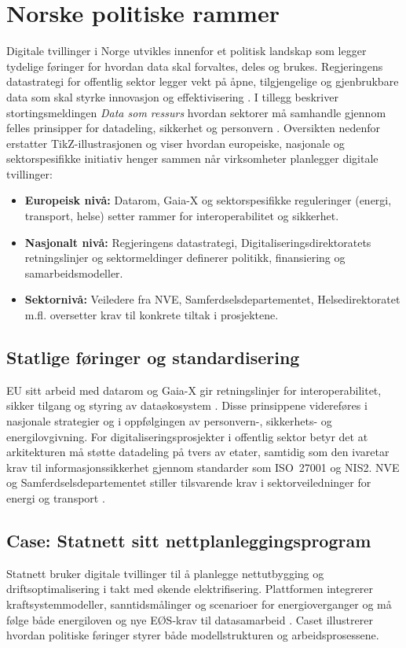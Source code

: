 \section{Norske politiske rammer}
Digitale tvillinger i Norge utvikles innenfor et politisk landskap som legger tydelige føringer for hvordan data skal forvaltes, deles og brukes. Regjeringens datastrategi for offentlig sektor legger vekt på åpne, tilgjengelige og gjenbrukbare data som skal styrke innovasjon og effektivisering \citep{regjeringen2022datastrategi}. I tillegg beskriver stortingsmeldingen \emph{Data som ressurs} hvordan sektorer må samhandle gjennom felles prinsipper for datadeling, sikkerhet og personvern \citep{meldst22datasomressurs}. Oversikten nedenfor erstatter TikZ-illustrasjonen og viser hvordan europeiske, nasjonale og sektorspesifikke initiativ henger sammen når virksomheter planlegger digitale tvillinger:
\begin{itemize}
    \item \textbf{Europeisk nivå:} Datarom, Gaia-X og sektorspesifikke reguleringer (energi, transport, helse) setter rammer for interoperabilitet og sikkerhet.
    \item \textbf{Nasjonalt nivå:} Regjeringens datastrategi, Digitaliseringsdirektoratets retningslinjer og sektormeldinger definerer politikk, finansiering og samarbeidsmodeller.
    \item \textbf{Sektornivå:} Veiledere fra NVE, Samferdselsdepartementet, Helsedirektoratet m.fl. oversetter krav til konkrete tiltak i prosjektene.
\end{itemize}

\subsection{Statlige føringer og standardisering}
EU sitt arbeid med datarom og Gaia-X gir retningslinjer for interoperabilitet, sikker tilgang og styring av dataøkosystem \citep{eu2020circulareconomy}. Disse prinsippene videreføres i nasjonale strategier og i oppfølgingen av personvern-, sikkerhets- og energilovgivning. For digitaliseringsprosjekter i offentlig sektor betyr det at arkitekturen må støtte datadeling på tvers av etater, samtidig som den ivaretar krav til informasjonssikkerhet gjennom standarder som ISO~27001 og NIS2. NVE og Samferdselsdepartementet stiller tilsvarende krav i sektorveiledninger for energi og transport \citep{nve2023nettplan,avinor2022digital}.

\subsection{Case: Statnett sitt nettplanleggingsprogram}
Statnett bruker digitale tvillinger til å planlegge nettutbygging og driftsoptimalisering i takt med økende elektrifisering. Plattformen integrerer kraftsystemmodeller, sanntidsmålinger og scenarioer for energioverganger og må følge både energiloven og nye EØS-krav til datasamarbeid \citep{statnett2023digital}. Caset illustrerer hvordan politiske føringer styrer både modellstrukturen og arbeidsprosessene.

